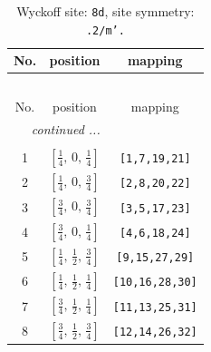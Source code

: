 \documentclass[fleqn,8pt]{jsarticle}
\begin{document}
\begin{longtable}{ccc}
\caption{Wyckoff site: {\tt 8d}, site symmetry: {\tt .2/m'.}}
 \\
 \hline \hline
No. & position & mapping \\ \hline \endfirsthead

\multicolumn{2}{l}{\tablename\ \thetable{}} \\
 \hline \hline
No. & position & mapping \\ \hline \endhead

 \hline \hline
\multicolumn{2}{r}{\footnotesize\it continued ...} \\ \endfoot

 \hline \hline
\multicolumn{2}{r}{} \\ \endlastfoot

1 & $\left[ \frac{1}{4},\, 0,\, \frac{1}{4} \right]$ & {\tt [1,7,19,21]} \\ \hline
2 & $\left[ \frac{1}{4},\, 0,\, \frac{3}{4} \right]$ & {\tt [2,8,20,22]} \\ \hline
3 & $\left[ \frac{3}{4},\, 0,\, \frac{3}{4} \right]$ & {\tt [3,5,17,23]} \\ \hline
4 & $\left[ \frac{3}{4},\, 0,\, \frac{1}{4} \right]$ & {\tt [4,6,18,24]} \\ \hline
5 & $\left[ \frac{1}{4},\, \frac{1}{2},\, \frac{3}{4} \right]$ & {\tt [9,15,27,29]} \\ \hline
6 & $\left[ \frac{1}{4},\, \frac{1}{2},\, \frac{1}{4} \right]$ & {\tt [10,16,28,30]} \\ \hline
7 & $\left[ \frac{3}{4},\, \frac{1}{2},\, \frac{1}{4} \right]$ & {\tt [11,13,25,31]} \\ \hline
8 & $\left[ \frac{3}{4},\, \frac{1}{2},\, \frac{3}{4} \right]$ & {\tt [12,14,26,32]} \\
\end{longtable}
\renewcommand{\arraystretch}{1.2}
\end{document}
